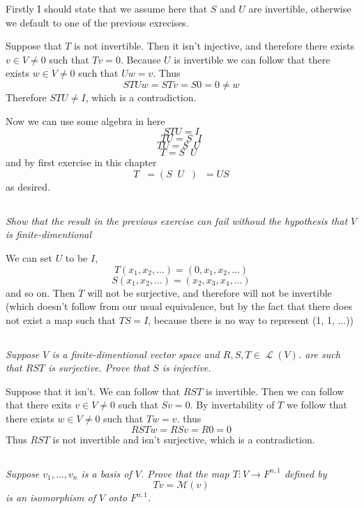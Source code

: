 \documentclass[11pt,oneside,titlepage]{book}
\DeclareMathOperator \map {\mathcal {L}}
\DeclareMathOperator \inv {^{-1}}
\begin{document}
Firstly I should state that we assume here that $S$ and $U$ are invertible, otherwise we default
to one of the previous exrecises. 

Suppose that $T$ is not invertible. Then it isn't injective, and therefore there exists
$v \in V \neq 0$ such that $Tv = 0$. Because $U$ is invertible we can follow that there exists
$w \in V \neq 0$ such that $Uw = v$. Thus
$$STUw = STv = S0 = 0 \neq w$$
Therefore $STU \neq I$, which is a contradiction.

Now we can use some algebra in here
$$STU = I$$
$$TU = S \inv I$$
$$TU = S \inv U \inv$$
$$T = S \inv U \inv$$
and by first exercise in this chapter
$$T \inv = (S \inv U \inv) \inv = US$$
as desired.

\subsection{}

\textit{Show that the result in the previous exercise can fail withoud the hypothesis that $V$
  is finite-dimentional}

We can set $U$ to be $I$,
$$T(x_1, x_2, ...) = (0, x_1, x_2, ...)$$
$$S(x_1, x_2, ...) = (x_2, x_3, x_4, ...)$$
and so on. Then $T$ will not be surjective, and therefore will not be invertible (which doesn't
follow from our usual equivalence, but by the fact that there does not exist a map such
that $TS = I$, because there is no way to represent (1, 1, ...))

\subsection{}

\textit{Suppose $V$ is a finite-dimentional vector space and $R, S, T \in \map(V)$. are
  such that $RST$ is surjective. Prove that $S$ is injective.}

Suppose that it isn't. We can follow that $RST$ is invertible.
Then we can follow that there exits $v \in V \neq 0$ such that
$Sv = 0$. By invertability of $T$ we follow that there exists $w \in V \neq 0$
such that $Tw = v$. thus
$$RSTw = RSv = R0 = 0$$
Thus $RST$ is not invertible and isn't surjective, which is a contradiction.

\subsection{}

\textit{Suppose $v_1, ..., v_n$ is a basis of $V$. Prove that the map $T: V \to F^{n, 1}$
  defined by }
$$Tv = \mathcal M (v)$$
\textit{is an isomorphism of $V$ onto $F^{n, 1}$.}
\end{document}
